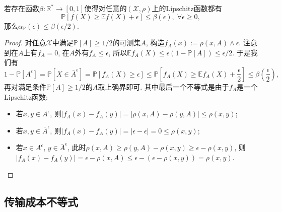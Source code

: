 \begin{theorem}
	若存在函数$\beta \colon \mathbb{R}^* \to [0, 1]$使得对任意的$(\mathcal{X}, \rho)$上的Lipschitz函数都有
	\begin{equation*}
		\mathbb{P}[f(X) \geq \mathbb{E}f(X) + \epsilon] \leq \beta(\epsilon),\; \forall \epsilon \geq 0, 
	\end{equation*}
	那么$\alpha_{\mathbb{P}}(\epsilon) \leq \beta(\epsilon / 2)$. 
\end{theorem}
\begin{proof}
	对任意$\mathcal{X}$中满足$\mathbb{P}[A] \geq 1/2$的可测集$A$, 构造$f_A(x) := \rho(x, A) \wedge \epsilon$. 
	注意到在$A$上有$f_A = 0$, 在$A$外有$f_A \leq \epsilon$, 所以$\mathbb{E}f_A(X) \leq \epsilon (1 - \mathbb{P}[A]) \leq \epsilon / 2$. 
	于是我们有
	\begin{equation*}
		1 - \mathbb{P}[A^\epsilon]
		= \mathbb{P}[X \in \bar A^{\epsilon}]
		= \mathbb{P}[f_A(X) \geq \epsilon] 
		\leq \mathbb{P}\left[f_A(X) \geq \mathbb{E}f_A(X) + \frac{\epsilon}{2}\right]
		\leq \beta\left( \frac{\epsilon}{2} \right),  
	\end{equation*}
	再对满足条件$\mathbb{P}[A] \geq 1/2$的$A$取上确界即可. 
	其中最后一个不等式是由于$f_A$是一个Lipschitz函数: 
	\begin{itemize}
		\item 若$x, y \in A^{\epsilon}$, 则$|f_A(x) - f_A(y)| = |\rho(x, A) - \rho(y, A) | \leq  \rho(x, y)$; 
		\item 若$x, y \in \bar A^{\epsilon}$, 则$|f_A(x) - f_A(y)| = |\epsilon - \epsilon| = 0 \leq \rho(x, y)$;
		\item 若$x \in A^{\epsilon}$, $y \in \bar A^{\epsilon}$, 此时$\rho(x, A) \geq \rho(y, A) - \rho(x, y) \geq \epsilon - \rho(x, y)$, 则$|f_A(x) - f_A(y)| =  \epsilon - \rho(x, A) \leq \epsilon - (\epsilon - \rho(x, y)) = \rho(x, y)$.
	\end{itemize}
\end{proof}


\subsection{传输成本不等式}

